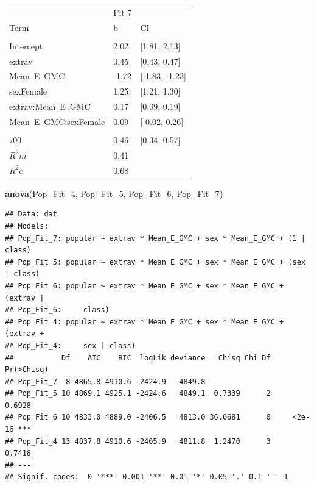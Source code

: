 \documentclass[]{article}
\newenvironment{Shaded}{\begin{snugshade}}{\end{snugshade}}
\newcommand{\KeywordTok}[1]{\textcolor[rgb]{0.13,0.29,0.53}{\textbf{#1}}}
\newcommand{\DecValTok}[1]{\textcolor[rgb]{0.00,0.00,0.81}{#1}}
\newcommand{\NormalTok}[1]{#1}
\begin{document}
\begin{tabular}{lll}
\toprule
\multicolumn{1}{c}{ } & \multicolumn{1}{c}{Fit 7} \\
\cmidrule(l{2pt}r{2pt}){2-2}
Term & b & CI\\
\midrule
\addlinespace[0.3em]
\multicolumn{3}{l}{\textbf{Fixed}}\\
\hspace{1em}Intercept & 2.02 & [1.81, 2.13]\\
\hspace{1em}extrav & 0.45 & [0.43, 0.47]\\
\hspace{1em}Mean\ E\ GMC & -1.72 & [-1.83, -1.23]\\
\hspace{1em}sexFemale & 1.25 & [1.21, 1.30]\\
\hspace{1em}extrav:Mean\ E\ GMC & 0.17 & [0.09, 0.19]\\
\hspace{1em}Mean\ E\ GMC:sexFemale & 0.09 & [-0.02, 0.26]\\
\addlinespace[0.3em]
\multicolumn{3}{l}{\textbf{Random}}\\
\hspace{1em}$\tau {00}$ & 0.46 & [0.34, 0.57]\\
$R^2 m$ & 0.41 & \\
$R^2 c$ & 0.68 & \\
\bottomrule
\end{tabular}

\begin{Shaded}
\begin{Highlighting}[]
\KeywordTok{anova}\NormalTok{(Pop_Fit_}\DecValTok{4}\NormalTok{, Pop_Fit_}\DecValTok{5}\NormalTok{, Pop_Fit_}\DecValTok{6}\NormalTok{, Pop_Fit_}\DecValTok{7}\NormalTok{)}
\end{Highlighting}
\end{Shaded}

\begin{verbatim}
## Data: dat
## Models:
## Pop_Fit_7: popular ~ extrav * Mean_E_GMC + sex * Mean_E_GMC + (1 | class)
## Pop_Fit_5: popular ~ extrav * Mean_E_GMC + sex * Mean_E_GMC + (sex | class)
## Pop_Fit_6: popular ~ extrav * Mean_E_GMC + sex * Mean_E_GMC + (extrav | 
## Pop_Fit_6:     class)
## Pop_Fit_4: popular ~ extrav * Mean_E_GMC + sex * Mean_E_GMC + (extrav + 
## Pop_Fit_4:     sex | class)
##           Df    AIC    BIC  logLik deviance   Chisq Chi Df Pr(>Chisq)    
## Pop_Fit_7  8 4865.8 4910.6 -2424.9   4849.8                              
## Pop_Fit_5 10 4869.1 4925.1 -2424.6   4849.1  0.7339      2     0.6928    
## Pop_Fit_6 10 4833.0 4889.0 -2406.5   4813.0 36.0681      0     <2e-16 ***
## Pop_Fit_4 13 4837.8 4910.6 -2405.9   4811.8  1.2470      3     0.7418    
## ---
## Signif. codes:  0 '***' 0.001 '**' 0.01 '*' 0.05 '.' 0.1 ' ' 1
\end{verbatim}
\end{document}
